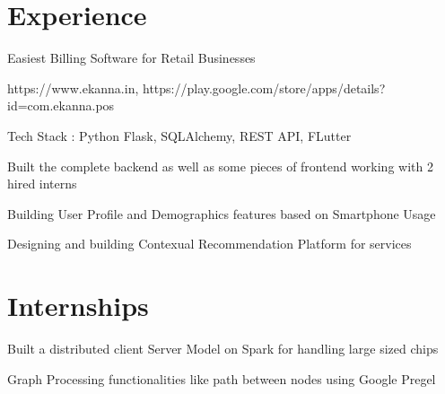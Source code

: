 \documentclass[]{deedy-resume-openfont}
\begin{document}
\hfill
\begin{minipage}[t]{0.66\textwidth} 


\section{Experience}

\vspace{\topsep} %
\begin{tightemize}
\item Easiest Billing Software for Retail Businesses
\item https://www.ekanna.in, https://play.google.com/store/apps/details?id=com.ekanna.pos
\item Tech Stack : Python Flask, SQLAlchemy, REST API, FLutter 
\item Built the complete backend as well as some pieces of frontend working with 2 hired interns
\end{tightemize}
\sectionsep

\begin{tightemize}
\item Building User Profile and Demographics features based on Smartphone Usage 
\item Designing and building Contexual Recommendation Platform for services 
\end{tightemize}
\sectionsep


\section{Internships}

\begin{tightemize}
\item Built a distributed client Server Model on Spark for handling large sized chips
\item Graph Processing functionalities like path between nodes using Google Pregel 
\end{tightemize}
\sectionsep


\end{minipage}
\end{document}
